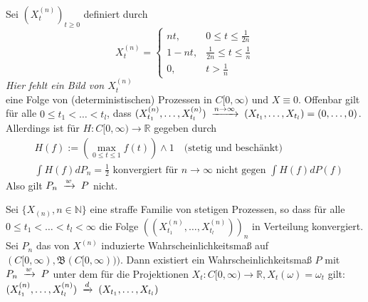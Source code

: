 \documentclass[a4paper,twoside,DIV15,BCOR12mm]{scrbook}
\newcommand{\borel}{{\mathfrak B}}
\begin{document}
\begin{beispiel}
  Sei $(X_t^{(n)})_{t\geq0}$ definiert durch
\[
X_t^{(n)}=
\begin{cases}
nt, & 0\leq t\leq \frac{1}{2n} \\
1-nt, & \frac{1}{2n}\leq t\leq\frac{1}{n} \\
0, & t>\frac{1}{n}
\end{cases}
\]
\emph{Hier fehlt ein Bild von $X_t^{(n)}$} \\
eine Folge von (deterministischen) Prozessen in $C[0,\infty)$ und $X\equiv 0$. Offenbar gilt für alle $0\leq t_1<\dots<t_l$, dass $(X_{t_1}^{(n)},\dots,X_{t_l}^{(n)})\tomit{n\to\infty}(X_{t_1},\dots,X_{t_l})=(0,\dots,0)$. \\
Allerdings ist für $H:C[0,\infty)\longrightarrow\mathbb R$ gegeben durch 
  \begin{align*}
  & H(f):=\left(\max_{0\leq t\leq1}f(t)\right)\wedge1\quad \text{(stetig und beschänkt)} \\
 & \int H(f)dP_n=\frac{1}{2}\text{ konvergiert für $n\to\infty$ nicht gegen } \int H(f)dP(f)
  \end{align*}
Also gilt $P_n\tomit{w}P$ nicht.
\end{beispiel}
\begin{satz}
  \label{satz:14.3}
Sei $\{X_{(n)},n\in\mathbb N\}$ eine straffe Familie von stetigen Prozessen, so dass für alle $0\leq t_1<\dots<t_l<\infty$ die Folge $((X_{t_1}^{(n)},\dots,X_{t_l}^{(n)}))_n$ in Verteilung konvergiert. Sei $P_n$ das von $X^{(n)}$ induzierte Wahrscheinlichkeitsmaß auf $(C[0,\infty),\borel(C[0,\infty)))$. Dann existiert ein Wahrscheinlichkeitsmaß $P$ mit $P_n\tomit{w}P$ unter dem für die Projektionen $X_t:C[0,\infty)\longrightarrow\mathbb R,X_t(\omega)=\omega_t$ gilt: $(X_{t_1}^{(n)},\dots,X_{t_l}^{(n)})\tomit{d}(X_{t_1},\dots,X_{t_l})$
\end{satz}
\end{document}

